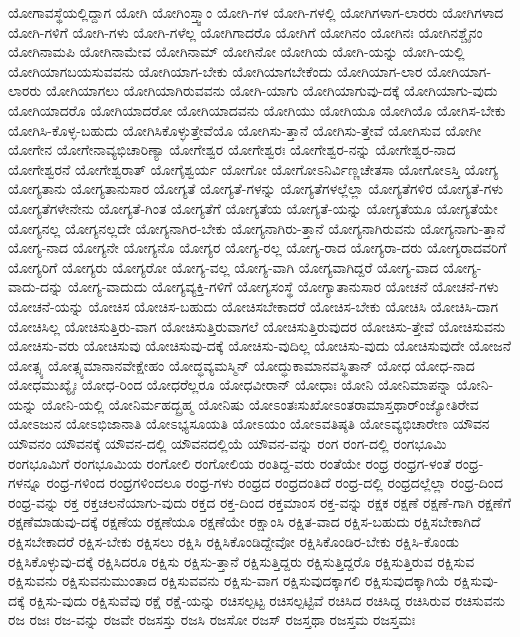 {ಯೋಗಾವಸ್ಥೆಯಲ್ಲಿದ್ದಾಗ
ಯೋಗಿ
ಯೋಗಿಂಸ್ತ್ವಾಂ
ಯೋಗಿ-ಗಳ
ಯೋಗಿ-ಗಳಲ್ಲಿ
ಯೋಗಿಗಳಾಗ-ಲಾರರು
ಯೋಗಿಗಳಾದ
ಯೋಗಿ-ಗಳಿಗೆ
ಯೋಗಿ-ಗಳು
ಯೋಗಿ-ಗಳೆಲ್ಲ
ಯೋಗಿಗಾದರೊ
ಯೋಗಿಗೆ
ಯೋಗಿನಂ
ಯೋಗಿನಃ
ಯೋಗಿನಶ್ಚೈನಂ
ಯೋಗಿನಾಮಪಿ
ಯೋಗಿನಾಮೇವ
ಯೋಗಿನಾಮ್
ಯೋಗಿನೋ
ಯೋಗಿಯ
ಯೋಗಿ-ಯನ್ನು
ಯೋಗಿ-ಯಲ್ಲಿ
ಯೋಗಿಯಾಗಬಯಸುವವನು
ಯೋಗಿಯಾಗ-ಬೇಕು
ಯೋಗಿಯಾಗಬೇಕೆಂದು
ಯೋಗಿಯಾಗ-ಲಾರ
ಯೋಗಿಯಾಗ-ಲಾರರು
ಯೋಗಿಯಾಗಲು
ಯೋಗಿಯಾಗಿರುವವನು
ಯೋಗಿ-ಯಾಗು
ಯೋಗಿಯಾಗುವು-ದಕ್ಕೆ
ಯೋಗಿಯಾಗು-ವುದು
ಯೋಗಿಯಾದರೊ
ಯೋಗಿಯಾದರೋ
ಯೋಗಿಯಾದವನು
ಯೋಗಿಯು
ಯೋಗಿಯೂ
ಯೋಗಿಯೊ
ಯೋಗಿಸ-ಬೇಕು
ಯೋಗಿಸಿ-ಕೊಳ್ಳ-ಬಹುದು
ಯೋಗಿಸಿಕೊಳ್ಳುತ್ತೇವೆಯೊ
ಯೋಗಿಸು-ತ್ತಾನೆ
ಯೋಗಿಸು-ತ್ತೇವೆ
ಯೋಗಿಸುವ
ಯೋಗೀ
ಯೋಗೇನ
ಯೋಗೇನಾವ್ಯಭಿಚಾರಿಣ್ಯಾ
ಯೋಗೇಶ್ವರ
ಯೋಗೇಶ್ವರಃ
ಯೋಗೇಶ್ವರ-ನನ್ನು
ಯೋಗೇಶ್ವರ-ನಾದ
ಯೋಗೇಶ್ವರನೆ
ಯೋಗೇಶ್ವರಾತ್
ಯೋಗೈಶ್ವರ್ಯ
ಯೋಗೋ
ಯೋಗೋಽನಿರ್ವಿಣ್ಣಚೇತಸಾ
ಯೋಗೋಽಸ್ತಿ
ಯೋಗ್ಯ
ಯೋಗ್ಯತಾನು
ಯೋಗ್ಯತಾನುಸಾರ
ಯೋಗ್ಯತೆ
ಯೋಗ್ಯತೆ-ಗಳನ್ನು
ಯೋಗ್ಯತೆಗಳಲ್ಲೆಲ್ಲಾ
ಯೋಗ್ಯತೆಗಳಿರ
ಯೋಗ್ಯತೆ-ಗಳು
ಯೋಗ್ಯತೆಗಳೇನೇನು
ಯೋಗ್ಯತೆ-ಗಿಂತ
ಯೋಗ್ಯತೆಗೆ
ಯೋಗ್ಯತೆಯ
ಯೋಗ್ಯತೆ-ಯನ್ನು
ಯೋಗ್ಯತೆಯೂ
ಯೋಗ್ಯತೆಯೇ
ಯೋಗ್ಯನಲ್ಲ
ಯೋಗ್ಯನಲ್ಲದೇ
ಯೋಗ್ಯನಾಗಿರ-ಬೇಕು
ಯೋಗ್ಯನಾಗಿರು-ತ್ತಾನೆ
ಯೋಗ್ಯನಾಗಿರುವನು
ಯೋಗ್ಯನಾಗು-ತ್ತಾನೆ
ಯೋಗ್ಯ-ನಾದ
ಯೋಗ್ಯನೇ
ಯೋಗ್ಯನೊ
ಯೋಗ್ಯರ
ಯೋಗ್ಯ-ರಲ್ಲ
ಯೋಗ್ಯ-ರಾದ
ಯೋಗ್ಯರಾ-ದರು
ಯೋಗ್ಯರಾದವರಿಗೆ
ಯೋಗ್ಯರಿಗೆ
ಯೋಗ್ಯರು
ಯೋಗ್ಯರೋ
ಯೋಗ್ಯ-ವಲ್ಲ
ಯೋಗ್ಯ-ವಾಗಿ
ಯೋಗ್ಯವಾಗಿದ್ದರೆ
ಯೋಗ್ಯ-ವಾದ
ಯೋಗ್ಯ-ವಾದು-ದನ್ನು
ಯೋಗ್ಯ-ವಾದುದು
ಯೋಗ್ಯವ್ಯಕ್ತಿ-ಗಳಿಗೆ
ಯೋಗ್ಯಸಂಸ್ಥೆ
ಯೋಗ್ಯಾತಾನುಸಾರ
ಯೋಚನೆ
ಯೋಚನೆ-ಗಳು
ಯೋಚನೆ-ಯನ್ನು
ಯೋಚಿಸ
ಯೋಚಿಸ-ಬಹುದು
ಯೋಚಿಸಬೇಕಾದರೆ
ಯೋಚಿಸ-ಬೇಕು
ಯೋಚಿಸಿ
ಯೋಚಿಸಿ-ದಾಗ
ಯೋಚಿಸಿಲ್ಲ
ಯೋಚಿಸುತ್ತಿರು-ವಾಗ
ಯೋಚಿಸುತ್ತಿರುವಾಗಲೆ
ಯೋಚಿಸುತ್ತಿರುವುದರ
ಯೋಚಿಸು-ತ್ತೇವೆ
ಯೋಚಿಸುವನು
ಯೋಚಿಸು-ವರು
ಯೋಚಿಸುವು
ಯೋಚಿಸುವು-ದಕ್ಕೆ
ಯೋಚಿಸು-ವುದಿಲ್ಲ
ಯೋಚಿಸು-ವುದು
ಯೋಚಿಸುವುದೇ
ಯೋಜನೆ
ಯೋತ್ಸ್ಯ
ಯೋತ್ಸ್ಯಮಾನಾನವೇಕ್ಷೇಹಂ
ಯೋದ್ಧವ್ಯಮಸ್ಮಿನ್
ಯೋದ್ಧುಕಾಮಾನವಸ್ಥಿತಾನ್
ಯೋಧ
ಯೋಧ-ನಾದ
ಯೋಧಮುಖ್ಯೈಃ
ಯೋಧ-ರಿಂದ
ಯೋಧರೆಲ್ಲರೂ
ಯೋಧವೀರಾನ್
ಯೋಧಾಃ
ಯೋನಿ
ಯೋನಿಮಾಪನ್ನಾ
ಯೋನಿ-ಯನ್ನು
ಯೋನಿ-ಯಲ್ಲಿ
ಯೋನಿರ್ಮಹದ್ಬ್ರಹ್ಮ
ಯೋನಿಷು
ಯೋಽಂತಃಸುಖೋಽಂತರಾಮಾಸ್ತಥಾರ್ಂಜ್ಯೋತಿರೇವ
ಯೋಽಜುನ
ಯೋಽಭಿಜಾನಾತಿ
ಯೋಽಭ್ಯಸೂಯತಿ
ಯೋಽಯಂ
ಯೋಽವತಿಷ್ಠತಿ
ಯೋಽವ್ಯಭಿಚಾರೇಣ
ಯೌವನ
ಯೌವನಂ
ಯೌವನಕ್ಕೆ
ಯೌವನ-ದಲ್ಲಿ
ಯೌವನದಲ್ಲಿಯೆ
ಯೌವನ-ವನ್ನು
ರಂಗ
ರಂಗ-ದಲ್ಲಿ
ರಂಗಭೂಮಿ
ರಂಗಭೂಮಿಗೆ
ರಂಗಭೂಮಿಯ
ರಂಗೋಲಿ
ರಂಗೋಲಿಯ
ರಂತಿದ್ದ-ವರು
ರಂತೆಯೇ
ರಂಧ್ರ
ರಂಧ್ರಗ-ಳಂತೆ
ರಂಧ್ರ-ಗಳನ್ನೂ
ರಂಧ್ರ-ಗಳಿಂದ
ರಂಧ್ರಗಳಿಂದಲೂ
ರಂಧ್ರ-ಗಳು
ರಂಧ್ರದ
ರಂಧ್ರದಂತಿದೆ
ರಂಧ್ರ-ದಲ್ಲಿ
ರಂಧ್ರದಲ್ಲೆಲ್ಲಾ
ರಂಧ್ರ-ದಿಂದ
ರಂಧ್ರ-ವನ್ನು
ರಕ್ತ
ರಕ್ತಚಲನೆಯಾಗು-ವುದು
ರಕ್ತದ
ರಕ್ತ-ದಿಂದ
ರಕ್ತಮಾಂಸ
ರಕ್ತ-ವನ್ನು
ರಕ್ಷಕ
ರಕ್ಷಣೆ
ರಕ್ಷಣೆ-ಗಾಗಿ
ರಕ್ಷಣೆಗೆ
ರಕ್ಷಣೆಮಾಡುವು-ದಕ್ಕೆ
ರಕ್ಷಣೆಯ
ರಕ್ಷಣೆಯೂ
ರಕ್ಷಣೆಯೇ
ರಕ್ಷಾಂಸಿ
ರಕ್ಷಿತ-ವಾದ
ರಕ್ಷಿಸ-ಬಹುದು
ರಕ್ಷಿಸಬೇಕಾಗಿದೆ
ರಕ್ಷಿಸಬೇಕಾದರೆ
ರಕ್ಷಿಸ-ಬೇಕು
ರಕ್ಷಿಸಲು
ರಕ್ಷಿಸಿ
ರಕ್ಷಿಸಿಕೊಂಡಿದ್ದೇವೋ
ರಕ್ಷಿಸಿಕೊಂಡಿರ-ಬೇಕು
ರಕ್ಷಿಸಿ-ಕೊಂಡು
ರಕ್ಷಿಸಿಕೊಳ್ಳುವು-ದಕ್ಕೆ
ರಕ್ಷಿಸಿದರೂ
ರಕ್ಷಿಸು
ರಕ್ಷಿಸು-ತ್ತಾನೆ
ರಕ್ಷಿಸುತ್ತಿದ್ದರು
ರಕ್ಷಿಸುತ್ತಿದ್ದರೊ
ರಕ್ಷಿಸುತ್ತಿರುವ
ರಕ್ಷಿಸುವ
ರಕ್ಷಿಸುವನು
ರಕ್ಷಿಸುವನುಮುಂತಾದ
ರಕ್ಷಿಸುವವನು
ರಕ್ಷಿಸು-ವಾಗ
ರಕ್ಷಿಸುವುದಕ್ಕಾಗಲಿ
ರಕ್ಷಿಸುವುದಕ್ಕಾಗಿಯೆ
ರಕ್ಷಿಸುವು-ದಕ್ಕೆ
ರಕ್ಷಿಸು-ವುದು
ರಕ್ಷಿಸುವೆವು
ರಕ್ಷೆ
ರಕ್ಷೆ-ಯನ್ನು
ರಚಿಸಲ್ಪಟ್ಟ
ರಚಿಸಲ್ಪಟ್ಟಿವೆ
ರಚಿಸಿದ
ರಚಿಸಿದ್ದ
ರಚಿಸಿರುವ
ರಚಿಸುವನು
ರಜ
ರಜಃ
ರಜ-ವನ್ನು
ರಜವೇ
ರಜಸಸ್ತು
ರಜಸಿ
ರಜಸೋ
ರಜಸ್
ರಜಸ್ತಥಾ
ರಜಸ್ತಮ
ರಜಸ್ತಮಃ
}
